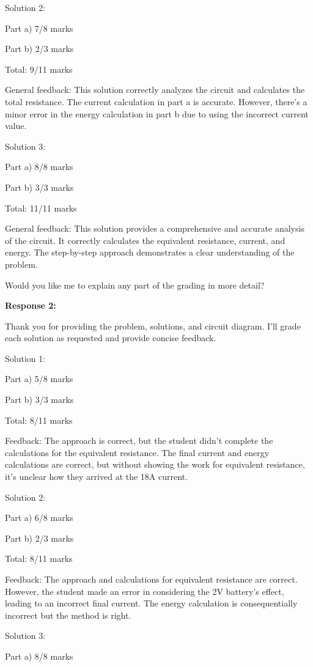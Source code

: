 \documentclass[a4paper,11pt]{article}
\begin{document}
Solution 2:

Part a) 7/8 marks

Part b) 2/3 marks

Total: 9/11 marks

General feedback: This solution correctly analyzes the circuit and calculates the total resistance. The current calculation in part a is accurate. However, there's a minor error in the energy calculation in part b due to using the incorrect current value.

Solution 3:

Part a) 8/8 marks

Part b) 3/3 marks

Total: 11/11 marks

General feedback: This solution provides a comprehensive and accurate analysis of the circuit. It correctly calculates the equivalent resistance, current, and energy. The step-by-step approach demonstrates a clear understanding of the problem.

Would you like me to explain any part of the grading in more detail?

\bigskip
\textbf{Response 2:}

Thank you for providing the problem, solutions, and circuit diagram. I'll grade each solution as requested and provide concise feedback.

Solution 1:

Part a) 5/8 marks

Part b) 3/3 marks

Total: 8/11 marks

Feedback: The approach is correct, but the student didn't complete the calculations for the equivalent resistance. The final current and energy calculations are correct, but without showing the work for equivalent resistance, it's unclear how they arrived at the 18A current.

Solution 2:

Part a) 6/8 marks

Part b) 2/3 marks

Total: 8/11 marks

Feedback: The approach and calculations for equivalent resistance are correct. However, the student made an error in considering the 2V battery's effect, leading to an incorrect final current. The energy calculation is consequentially incorrect but the method is right.

Solution 3:

Part a) 8/8 marks
\end{document}
